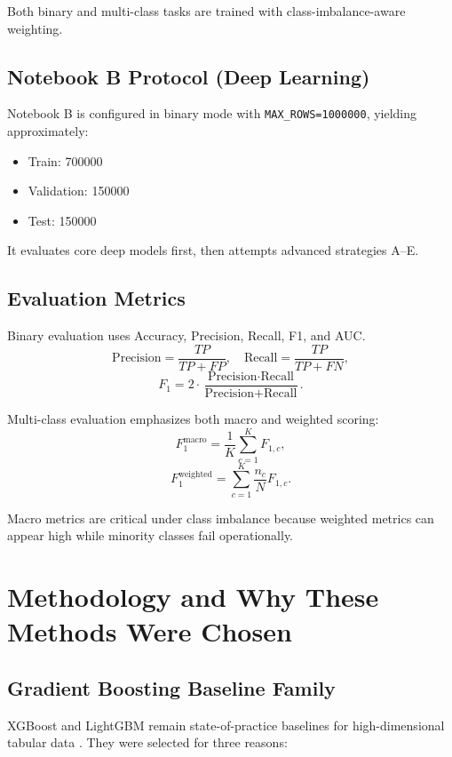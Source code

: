 \documentclass[10pt,journal]{IEEEtran}
\begin{document}
Both binary and multi-class tasks are trained with class-imbalance-aware weighting.

\subsection{Notebook B Protocol (Deep Learning)}
Notebook B is configured in binary mode with \texttt{MAX\_ROWS=1000000}, yielding approximately:

\begin{itemize}
\item Train: \num{700000}
\item Validation: \num{150000}
\item Test: \num{150000}
\end{itemize}

It evaluates core deep models first, then attempts advanced strategies A--E.

\subsection{Evaluation Metrics}
Binary evaluation uses Accuracy, Precision, Recall, F1, and AUC.
\begin{equation}
\text{Precision}=\frac{TP}{TP+FP},\quad
\text{Recall}=\frac{TP}{TP+FN},
\end{equation}
\begin{equation}
F_1 = 2\cdot\frac{\text{Precision}\cdot\text{Recall}}{\text{Precision}+\text{Recall}}.
\end{equation}

Multi-class evaluation emphasizes both macro and weighted scoring:
\begin{equation}
F_1^{\text{macro}} = \frac{1}{K}\sum_{c=1}^{K} F_{1,c},
\end{equation}
\begin{equation}
F_1^{\text{weighted}} = \sum_{c=1}^{K} \frac{n_c}{N}F_{1,c}.
\end{equation}

Macro metrics are critical under class imbalance because weighted metrics can appear high while minority classes fail operationally.

\section{Methodology and Why These Methods Were Chosen}
\subsection{Gradient Boosting Baseline Family}
XGBoost and LightGBM remain state-of-practice baselines for high-dimensional tabular data \cite{chen2016xgboost,ke2017lightgbm}. They were selected for three reasons:
\end{document}
